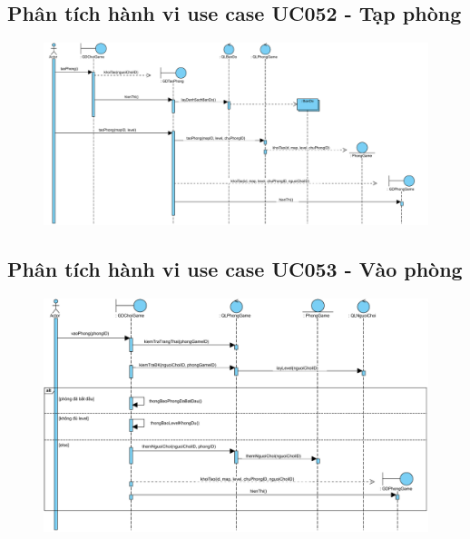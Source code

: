 \documentclass[3p]{elsarticle}
\begin{document}
\subsection{Phân tích hành vi use case UC052 - Tạp phòng}
\begin{figure}[!htbp]
	\hspace*{-.5in}
	\centering
	\includegraphics[scale=.45]{images/sequence-pdfs/gamer/PlayGame_CreateRoom.pdf}
\end{figure}
\newpage

\subsection{Phân tích hành vi use case UC053 - Vào phòng}
\begin{figure}[!htbp]
	\hspace*{-.5in}
	\centering
	\includegraphics[scale=.55]{images/sequence-pdfs/gamer/PlayGame_EnterGame.pdf}
\end{figure}
\newpage
\end{document}
